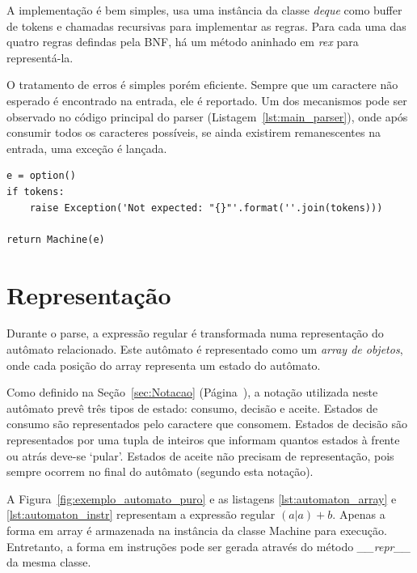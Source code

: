 \documentclass[a4paper,12pt,oneside,onecolumn]{uerj}
\begin{document}
A implementação é bem simples, usa uma instância da classe \emph{deque} como buffer de tokens e chamadas recursivas para implementar as regras. Para cada uma das quatro regras defindas pela BNF, há um método aninhado em \emph{rex} para representá-la.

O tratamento de erros é simples porém eficiente. Sempre que um caractere não esperado é encontrado na entrada, ele é reportado. Um dos mecanismos pode ser observado no código principal do parser (Listagem~\ref{lst:main_parser}), onde após consumir todos os caracteres possíveis, se ainda existirem remanescentes na entrada, uma exceção é lançada.

\vspace{0.5cm}
\noindent\begin{minipage}{\textwidth}
\begin{lstlisting}[caption={Exemplo de tratamento de erros no parser},label=lst:main_parser]
e = option()
if tokens: 
    raise Exception('Not expected: "{}"'.format(''.join(tokens)))

return Machine(e)
\end{lstlisting}
\end{minipage}

\section{Representação}

Durante o parse, a expressão regular é transformada numa representação do autômato relacionado. Este autômato é representado como um \emph{array de objetos}, onde cada posição do array representa um estado do autômato.

Como definido na Seção~\ref{sec:Notacao} (Página~\pageref{sec:Notacao}), a notação utilizada neste autômato prevê três tipos de estado: consumo, decisão e aceite. Estados de consumo são representados pelo caractere que consomem. Estados de decisão são representados por uma tupla de inteiros que informam quantos estados à frente ou atrás deve-se `pular'. Estados de aceite não precisam de representação, pois sempre ocorrem no final do autômato (segundo esta notação).

A Figura~\ref{fig:exemplo_automato_puro} e as listagens \ref{lst:automaton_array} e \ref{lst:automaton_instr} representam a expressão regular $(a|a)+b$. Apenas a forma em array é armazenada na instância da classe Machine para execução. Entretanto, a forma em instruções pode ser gerada através do método \emph{\_\_repr\_\_} da mesma classe.
\end{document}
